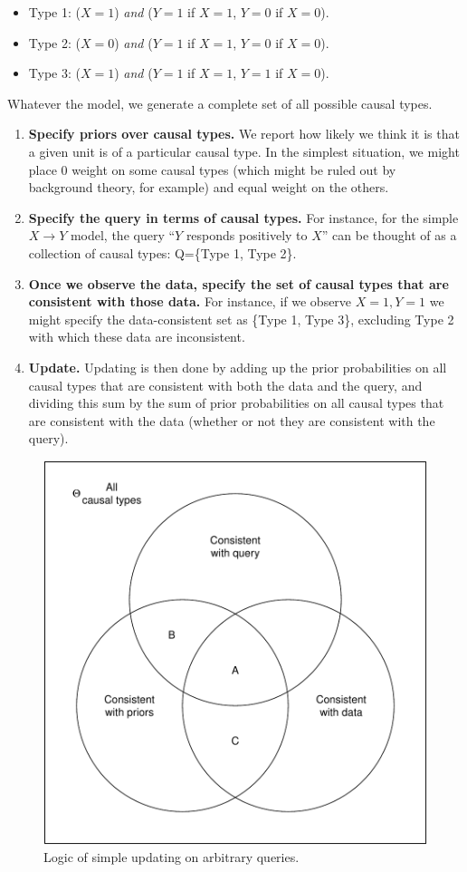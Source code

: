 \documentclass[
  12pt,
]{book}
\providecommand{\tightlist}{%
  \setlength{\itemsep}{0pt}\setlength{\parskip}{0pt}}
\begin{document}
\begin{itemize}
\tightlist
\item
  Type 1: (\(X=1\)) \emph{and} (\(Y=1\) if \(X=1\), \(Y=0\) if \(X=0\)).
\item
  Type 2: (\(X=0\)) \emph{and} (\(Y=1\) if \(X=1\), \(Y=0\) if \(X=0\)).
\item
  Type 3: (\(X=1\)) \emph{and} (\(Y=1\) if \(X=1\), \(Y=1\) if \(X=0\)).
\end{itemize}

Whatever the model, we generate a complete set of all possible causal types.

\begin{enumerate}
\def\labelenumi{\arabic{enumi}.}
\setcounter{enumi}{1}
\item
  \textbf{Specify priors over causal types.} We report how likely we think it is that a given unit is of a particular causal type. In the simplest situation, we might place 0 weight on some causal types (which might be ruled out by background theory, for example) and equal weight on the others.
\item
  \textbf{Specify the query in terms of causal types.} For instance, for the simple \(X \rightarrow Y\) model, the query ``\(Y\) responds positively to \(X\)'' can be thought of as a collection of causal types: Q=\{Type 1, Type 2\}.
\item
  \textbf{Once we observe the data, specify the set of causal types that are consistent with those data.} For instance, if we observe \(X=1, Y=1\) we might specify the data-consistent set as \{Type 1, Type 3\}, excluding Type 2 with which these data are inconsistent.
\item
  \textbf{Update.} Updating is then done by adding up the prior probabilities on all causal types that are consistent with both the data and the query, and dividing this sum by the sum of prior probabilities on all causal types that are consistent with the data (whether or not they are consistent with the query).
\end{enumerate}

\begin{figure}

{\centering \includegraphics[width=0.5\linewidth]{ii_files/figure-latex/ptvenn-1} 

}

\caption{Logic of simple updating on arbitrary queries.}\label{fig:ptvenn}
\end{figure}
\end{document}
